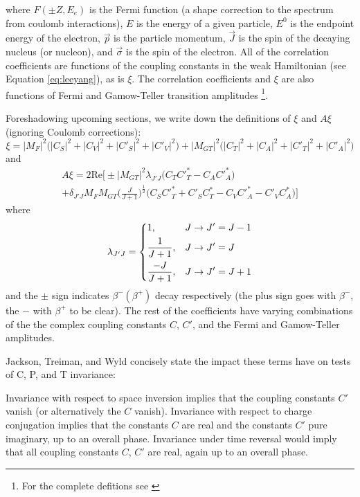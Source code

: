 %
where $F(\pm Z, E_e)$ is the Fermi function (a shape correction to the spectrum
from coulomb interactions), $E$ is the energy of a given particle, $E^0$ is the endpoint
energy of the electron, $\vec{p}$ is the particle momentum, $\vec{J}$ is the spin of the
decaying nucleus (or nucleon), and $\vec{\sigma}$ is the spin of the electron. All of the correlation coefficients
are functions of the coupling constants in the weak Hamiltonian (see Equation \ref{eq:leeyang}),
as is $\xi$. The correlation coefficients and $\xi$ are also functions of Fermi and Gamow-Teller
transition amplitudes \footnote{For the complete defitions see \cite{jackson1957a,jackson1957b,ebel1957}}.

Foreshadowing upcoming sections, we write down the definitions of $\xi$ and $A\xi$ (ignoring Coulomb
corrections):
%
\begin{equation}
  \xi = |M_F|^2\big(|C_S|^2+|C_V|^2+|C'_S|^2+|C'_V|^2\big)+|M_{GT}|^2\big(|C_T|^2+|C_A|^2+|C'_T|^2+|C'_A|^2\big)
  \label{eq:xi}
\end{equation}
%
and
\begin{multline}
  A\xi = 2\mathrm{Re}\bigg[\pm |M_{GT}|^2 \lambda_{J'J}\big(C_TC'^*_T-C_AC'^*_A \big) \\
    + \delta_{J'J}M_FM_{GT}\bigg( \frac{J}{J+1} \bigg)^{\frac{1}{2}}\big(C_SC'^*_T+C'_SC^*_T -C_VC'^*_A-C'_VC^*_A \big) \bigg]
  \label{eq:XiA}
\end{multline}
where
\begin{equation}
\lambda_{J'J} =
\begin{dcases}
  1, & J\rightarrow J'=J-1 \\
  \frac{1}{J+1}, &  J\rightarrow J'=J \\
  \frac{-J}{J+1}, &  J\rightarrow J'=J+1 \\
\end{dcases}
\end{equation}
and the $\pm$ sign indicates $\beta^-(\beta^+)$ decay respectively (the plus sign goes with
$\beta^-$, the $-$ with $\beta^+$ to be clear).
The rest of the coefficients have varying combinations of the the complex coupling
constants $C$, $C'$, and the Fermi and
Gamow-Teller amplitudes.

Jackson, Treiman, and Wyld concisely state the impact these terms have on tests of C, P, and
T invariance:
\begin{displayquote}
Invariance with respect to space inversion implies that the coupling constants $C'$
vanish (or alternatively the $C$ vanish). Invariance with respect to charge
conjugation implies that the constants $C$ are real and the constants $C'$
pure imaginary, up to an overall phase. Invariance under time reversal
would imply that all coupling constants $C$, $C'$ are real, again up to an
overall phase.
\end{displayquote}

